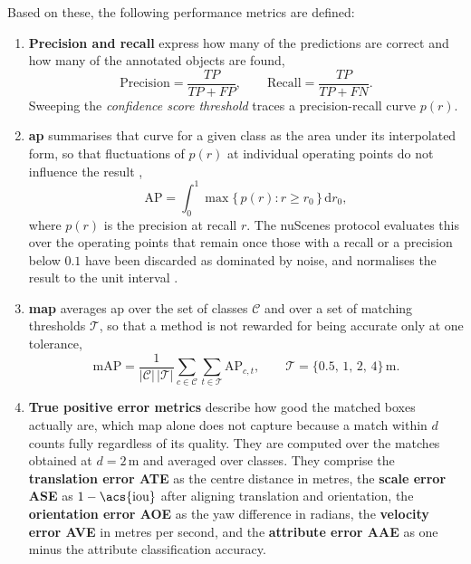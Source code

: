 Based on these, the following performance metrics are defined:

\begin{enumerate}
    \item \textbf{Precision and recall} express how many of the predictions are correct and how many of the
    annotated objects are found,
    \begin{equation}
        \mathrm{Precision} = \frac{TP}{TP + FP}, \qquad
        \mathrm{Recall} = \frac{TP}{TP + FN}.
        \label{eq:prec-rec}
    \end{equation}
    Sweeping the \emph{confidence score threshold} traces a precision-recall curve \(p(r)\).

    \item \textbf{\Acf{ap}} summarises that curve for a given class as the area under its interpolated
    form, so that fluctuations of \(p(r)\) at individual operating points do not influence the result
    \cite{Valverde2025Detection},
    \begin{equation}
        \mathrm{AP} = \int_{0}^{1} \max \big\{\, p(r) : r \ge r_{0} \,\big\} \, \mathrm{d}r_{0},
        \label{eq:ap}
    \end{equation}
    where \(p(r)\) is the precision at recall \(r\). The nuScenes protocol evaluates this over the
    operating points that remain once those with a recall or a precision below \(0.1\) have been discarded
    as dominated by noise, and normalises the result to the unit interval \cite{Caesar2020nuScenes}.

    \item \textbf{\Acf{map}} averages \acs{ap} over the set of classes \(\mathcal{C}\) and over a set of
    matching thresholds \(\mathcal{T}\), so that a method is not rewarded for being accurate only at one
    tolerance,
    \begin{equation}
        \mathrm{mAP} = \frac{1}{|\mathcal{C}|\,|\mathcal{T}|}
        \sum_{c \in \mathcal{C}} \sum_{t \in \mathcal{T}} \mathrm{AP}_{c,t},
        \qquad \mathcal{T} = \{0.5,\, 1,\, 2,\, 4\}\,\mathrm{m}.
        \label{eq:map}
    \end{equation}

    \item \textbf{True positive error metrics} describe how good the matched boxes actually are, which
    \acs{map} alone does not capture because a match within \(d\) counts fully regardless of its quality.
    They are computed over the matches obtained at \(d = 2\,\mathrm{m}\) and averaged over classes. They
    comprise the \textbf{translation error ATE} as the centre distance in metres, the \textbf{scale error ASE} as
    \(1 - \mathrm{\acs{iou}}\) after aligning translation and orientation, the \textbf{orientation error AOE} as the
    yaw difference in radians, the \textbf{velocity error AVE} in metres per second, and the \textbf{attribute error AAE} as
    one minus the attribute classification accuracy.


\end{enumerate}
